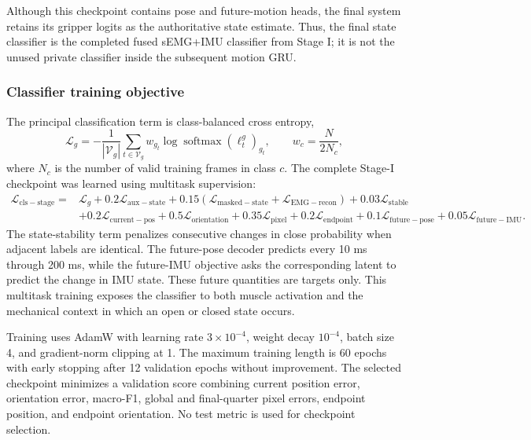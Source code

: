 Although this checkpoint contains pose and future-motion heads, the final
system retains its gripper logits as the authoritative state estimate.  Thus,
the final state classifier is the completed fused sEMG+IMU classifier from
Stage I; it is not the unused private classifier inside the subsequent motion
GRU.

\subsubsection{Classifier training objective}

The principal classification term is class-balanced cross entropy,
\begin{equation}
 \mathcal{L}_{g}=-\frac{1}{|\mathcal{V}_g|}
 \sum_{t\in\mathcal{V}_g} w_{g_t}
 \log\operatorname{softmax}(\boldsymbol{\ell}^{g}_t)_{g_t},
 \qquad
 w_c=\frac{N}{2N_c},
\end{equation}
where $N_c$ is the number of valid training frames in class $c$.  The complete
Stage-I checkpoint was learned using multitask supervision:
\begin{align}
 \mathcal{L}_{\mathrm{cls-stage}}
 ={}& \mathcal{L}_{g}
 +0.2\mathcal{L}_{\mathrm{aux-state}}
 +0.15(\mathcal{L}_{\mathrm{masked-state}}+
        \mathcal{L}_{\mathrm{EMG-recon}})
 +0.03\mathcal{L}_{\mathrm{stable}} \nonumber\\
 &+0.2\mathcal{L}_{\mathrm{current-pos}}
 +0.5\mathcal{L}_{\mathrm{orientation}}
 +0.35\mathcal{L}_{\mathrm{pixel}}
 +0.2\mathcal{L}_{\mathrm{endpoint}}
 +0.1\mathcal{L}_{\mathrm{future-pose}}
 +0.05\mathcal{L}_{\mathrm{future-IMU}}.
\end{align}
The state-stability term penalizes consecutive changes in close probability
when adjacent labels are identical.  The future-pose decoder predicts every
10 ms through 200 ms, while the future-IMU objective asks the corresponding
latent to predict the change in IMU state.  These future quantities are targets
only.  This multitask training exposes the classifier to both muscle activation
and the mechanical context in which an open or closed state occurs.

Training uses AdamW with learning rate $3\times10^{-4}$, weight decay
$10^{-4}$, batch size 4, and gradient-norm clipping at 1.  The maximum training
length is 60 epochs with early stopping after 12 validation epochs without
improvement.  The selected checkpoint minimizes a validation score combining
current position error, orientation error, macro-F1, global and final-quarter
pixel errors, endpoint position, and endpoint orientation.  No test metric is
used for checkpoint selection.

